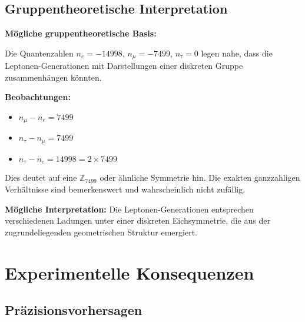 \documentclass[12pt,a4paper]{article}
\begin{document}
	\subsection{Gruppentheoretische Interpretation}
	
	\begin{abhandlung}
		\textbf{Mögliche gruppentheoretische Basis:}
		
		Die Quantenzahlen $n_e = -14998$, $n_\mu = -7499$, $n_\tau = 0$ legen nahe, dass die Leptonen-Generationen mit Darstellungen einer diskreten Gruppe zusammenhängen könnten.
		
		\textbf{Beobachtungen:}
		\begin{itemize}
			\item $n_\mu - n_e = 7499$
			\item $n_\tau - n_\mu = 7499$
			\item $n_\tau - n_e = 14998 = 2 \times 7499$
		\end{itemize}
		
		Dies deutet auf eine $\mathbb{Z}_{7499}$ oder ähnliche Symmetrie hin. Die exakten ganzzahligen Verhältnisse sind bemerkenswert und wahrscheinlich nicht zufällig.
		
		\textbf{Mögliche Interpretation:}
		Die Leptonen-Generationen entsprechen verschiedenen Ladungen unter einer diskreten Eichsymmetrie, die aus der zugrundeliegenden geometrischen Struktur emergiert.
	\end{abhandlung}
	

	\section{Experimentelle Konsequenzen}
	
	\subsection{Präzisionsvorhersagen}
	
\end{document}
